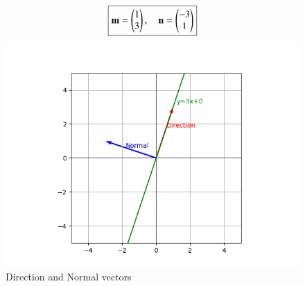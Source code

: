 \documentclass[12pt]{article}
\begin{document}
\[
\boxed{\mathbf{m} = \begin{pmatrix}1 \\ 3\end{pmatrix}, \quad \mathbf{n} = \begin{pmatrix}-3 \\ 1\end{pmatrix}}
\]

\begin{figure}[H]\centering
\includegraphics[width=1\columnwidth]{figs/plt.png}
\caption{Direction and Normal vectors}
\label{fig:plt}
\end{figure}
\end{document}
